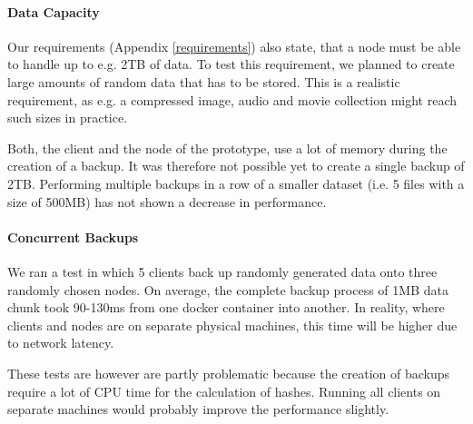 \paragraph{Data Capacity}
Our requirements (Appendix \ref{requirements}) also state, that a \gls{node} must be able to handle up to e.g. 2TB of data. To test this requirement, we planned to create large amounts of random data that has to be stored. This is a realistic requirement, as e.g. a compressed image, audio and movie collection might reach such sizes in practice.

Both, the \gls{client} and the \gls{node} of the prototype, use a lot of memory during the creation of a backup. It was therefore not possible yet to create a single backup of 2TB. Performing multiple backups in a row of a smaller dataset (i.e. 5 files with a size of 500MB) has not shown a decrease in performance.

\paragraph{Concurrent Backups}

We ran a test in which 5 \glspl{client} back up randomly generated data onto three randomly chosen \glspl{node}. On average, the complete backup process of 1MB data \gls{chunk} took 90-130ms from one docker container into another. In reality, where \glspl{client} and \glspl{node} are on separate physical machines,  this time will be higher due to network latency.

These tests are however are partly problematic because the creation of backups require a lot of CPU time for the calculation of hashes. Running all \glspl{client} on separate machines would probably improve the performance slightly.
